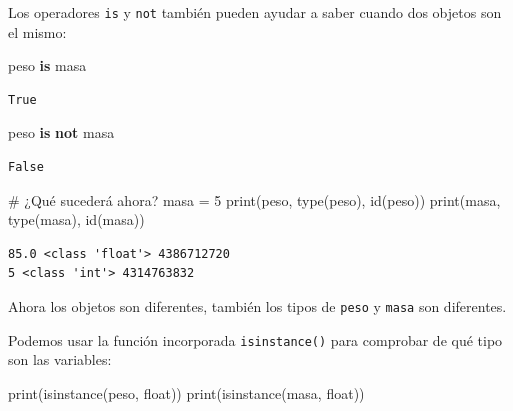 \documentclass[
  spanish,
  letterpaper,
]{scrbook}
\newenvironment{Shaded}{\begin{snugshade}}{\end{snugshade}}
\newcommand{\BuiltInTok}[1]{\textcolor[rgb]{0.00,0.23,0.31}{#1}}
\newcommand{\CommentTok}[1]{\textcolor[rgb]{0.37,0.37,0.37}{#1}}
\newcommand{\DecValTok}[1]{\textcolor[rgb]{0.68,0.00,0.00}{#1}}
\newcommand{\KeywordTok}[1]{\textcolor[rgb]{0.00,0.23,0.31}{\textbf{#1}}}
\newcommand{\NormalTok}[1]{\textcolor[rgb]{0.00,0.23,0.31}{#1}}
\newcommand{\OperatorTok}[1]{\textcolor[rgb]{0.37,0.37,0.37}{#1}}
\theoremstyle{definition}
\theoremstyle{remark}
\begin{document}
Los operadores \texttt{is} y \texttt{not} también pueden ayudar a saber
cuando dos objetos son el mismo:

\begin{Shaded}
\begin{Highlighting}[]
\NormalTok{peso }\KeywordTok{is}\NormalTok{ masa}
\end{Highlighting}
\end{Shaded}

\begin{verbatim}
True
\end{verbatim}

\begin{Shaded}
\begin{Highlighting}[]
\NormalTok{peso }\KeywordTok{is} \KeywordTok{not}\NormalTok{ masa}
\end{Highlighting}
\end{Shaded}

\begin{verbatim}
False
\end{verbatim}

\begin{Shaded}
\begin{Highlighting}[]
\CommentTok{\# ¿Qué sucederá ahora?}
\NormalTok{masa }\OperatorTok{=} \DecValTok{5}
\BuiltInTok{print}\NormalTok{(peso, }\BuiltInTok{type}\NormalTok{(peso), }\BuiltInTok{id}\NormalTok{(peso))}
\BuiltInTok{print}\NormalTok{(masa, }\BuiltInTok{type}\NormalTok{(masa), }\BuiltInTok{id}\NormalTok{(masa))}
\end{Highlighting}
\end{Shaded}

\begin{verbatim}
85.0 <class 'float'> 4386712720
5 <class 'int'> 4314763832
\end{verbatim}

Ahora los objetos son diferentes, también los tipos de \texttt{peso} y
\texttt{masa} son diferentes.

Podemos usar la función incorporada \texttt{isinstance()} para comprobar
de qué tipo son las variables:

\begin{Shaded}
\begin{Highlighting}[]
\BuiltInTok{print}\NormalTok{(}\BuiltInTok{isinstance}\NormalTok{(peso, }\BuiltInTok{float}\NormalTok{))}
\BuiltInTok{print}\NormalTok{(}\BuiltInTok{isinstance}\NormalTok{(masa, }\BuiltInTok{float}\NormalTok{))}
\end{Highlighting}
\end{Shaded}
\end{document}

